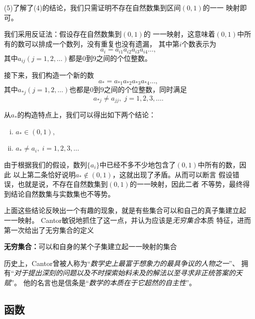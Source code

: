 \begin{shaded}
	(5)\;了解了(4)的结论，我们只需证明不存在自然数集到区间$(0,1)$的一一
	映射即可。
	
	我们采用反证法：假设存在自然数集到$(0,1)$的
	一一映射，这意味着$(0,1)$中所有的数可以排成一个数列，没有重复也没有遗漏，
	其中第$i$个数表示为
	$$a_i=a_{i1}a_{i2}a_{i3}a_{i4}\ldots,$$
	其中$a_{ij}(j=1,2,\ldots)$都是$0$到$9$之间的个位整数。
	
	接下来，我们构造一个新的数
	$$a_*=a_{*1}a_{*2}a_{*3}a_{*4}\ldots,$$
	其中$a_{*j}(j=1,2,\ldots)$也都是$0$到$9$之间的个位整数，同时满足
	$$a_{*j}\ne a_{jj},\; j=1,2,3,\ldots.$$
	
	从$a_*$的构造特点上，我们可以得出如下两个结论：
	\begin{enumerate}[(i)]
	  \setlength{\itemindent}{1cm}
	  \item $a_*\in(0,1)$,
	  \item $a_*\ne a_i,\;i=1,2,3,\ldots$
	\end{enumerate}
	由于根据我们的假设，数列$\{a_i\}$中已经不多不少地包含了$(0,1)$中所有的数，因此
	以上第二条恰好说明$a_*\notin(0,1)$，这就出现了矛盾。从而可以断言
	假设错误，也就是说，不存在自然数集到$(0,1)$的一一映射，因此二者
	不等势，最终得到结论自然数集与实数集也不等势。
	
	上面这些结论反映出一个有趣的现象，就是有些集合可以和自己的真子集建立起
	一一映射。	Cantor敏锐地抓住了这一点，并认为应该是{\b\it 无穷集合}本质
	特征，进而第一次给出了无穷集合的定义
	\begin{tcolorbox}
		{\bf 无穷集合：}可以和自身的某个子集建立起一一映射的集合
	\end{tcolorbox}
	历史上，Cantor曾被人称为“{\it 数学史上最富于想象力的最具争议的人物之一}”、
	拥有“{\it 对于提出深刻的问题以及不时探索始料未及的解法以至寻求非正统答案的天赋}”。
	他的名言也是信条是“{\it 数学的本质在于它超然的自主性}”。
\end{shaded}	

\subsection{函数}
	
